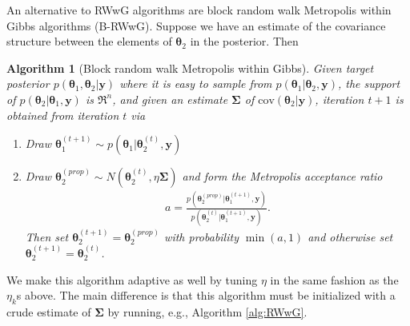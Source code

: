 \documentclass[12pt]{article}
\newtheorem{alg}{Algorithm}
\begin{document}
\begin{appendix}
An alternative to RWwG algorithms are block random walk Metropolis within Gibbs algorithms (B-RWwG). Suppose we have an estimate of the covariance structure between the elements of $\bm{\theta}_2$ in the posterior. Then 
\begin{alg}[Block random walk Metropolis within Gibbs]\label{alg:B-RWwG}
Given target posterior $p(\bm{\theta}_1,\bm{\theta}_2|\bm{y})$ where it is easy to sample from $p(\bm{\theta}_1|\bm{\theta}_2,\bm{y})$, the support of $p(\bm{\theta}_{2}|\bm{\theta}_1,\bm{y})$ is $\Re^n$, and given an estimate $\bm{\Sigma}$ of $\mathrm{cov}(\bm{\theta}_2|\bm{y})$, iteration $t+1$ is obtained from iteration $t$ via
\begin{enumerate}
\item Draw $\bm{\theta}_1^{(t+1)} \sim p(\bm{\theta}_1|\bm{\theta}_2^{(t)},\bm{y})$
\item Draw $\bm{\theta}_{2}^{(prop)} \sim N(\bm{\theta}_{2}^{(t)}, \eta\bm{\Sigma})$ and form the Metropolis acceptance ratio
\begin{align*}
a = \frac{p(\bm{\theta}_{2}^{(prop)}|\bm{\theta}_1^{(t+1)},\bm{y})}{p(\bm{\theta}_{2}^{(t)}|\bm{\theta}_1^{(t+1)},\bm{y})}.
\end{align*}
Then set $\bm{\theta}_{2}^{(t+1)}=\bm{\theta}_{2}^{(prop)}$ with probability $\min(a,1)$ and otherwise set $\bm{\theta}_{2}^{(t+1)} = \bm{\theta}_{2}^{(t)}$.
\end{enumerate}
\end{alg}
We make this algorithm adaptive as well by tuning $\eta$ in the same fashion as the $\eta_k$s above. The main difference is that this algorithm must be initialized with a crude estimate of $\bm{\Sigma}$ by running, e.g., Algorithm \ref{alg:RWwG}.
\end{appendix}

\clearpage\pagebreak\newpage\thispagestyle{empty}


\end{document}
